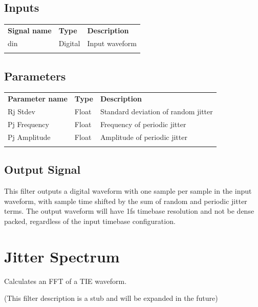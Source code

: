 \subsection{Inputs}

\begin{tabularx}{16cm}{llX}
\thickhline
\textbf{Signal name} & \textbf{Type} & \textbf{Description} \\
\thickhline
din & Digital & Input waveform\\
\thickhline
\end{tabularx}

\subsection{Parameters}

\begin{tabularx}{16cm}{llX}
\thickhline
\textbf{Parameter name} & \textbf{Type} & \textbf{Description} \\
\thickhline
Rj Stdev & Float & Standard deviation of random jitter\\
\thinhline
Pj Frequency & Float & Frequency of periodic jitter\\
\thinhline
Pj Amplitude & Float & Amplitude of periodic jitter\\
\thickhline
\end{tabularx}

\subsection{Output Signal}

This filter outputs a digital waveform with one sample per sample in the input waveform, with sample time shifted by
the sum of random and periodic jitter terms. The output waveform will have 1fs timebase resolution and not be dense
packed, regardless of the input timebase configuration.

\pagebreak
\section{Jitter Spectrum}

Calculates an FFT of a TIE waveform.

(This filter description is a stub and will be expanded in the future)

\pagebreak
